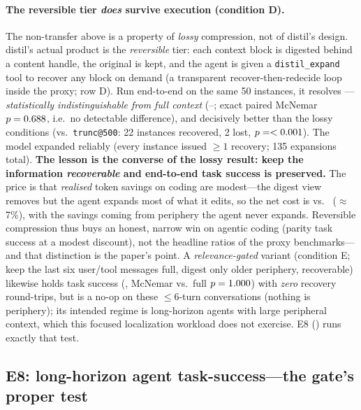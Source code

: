 \documentclass[11pt]{article}
\newcommand{\sweEsevenN}{50}\newcommand{\sweEsevenSeed}{1729}%
\newcommand{\sweEsevenFullPass}{--}\newcommand{\sweEsevenFullResolved}{--}%
\begin{document}
\paragraph{The reversible tier \emph{does} survive execution (condition D).} The
non-transfer above is a property of \emph{lossy} compression, not of distil's design.
distil's actual product is the \emph{reversible} tier: each context block is digested
behind a content handle, the original is kept, and the agent is given a
\texttt{distil\_expand} tool to recover any block on demand (a transparent
recover-then-redecide loop inside the proxy;  row D). Run end-to-end on the
same \sweEsevenN{} instances, it resolves \textbf{\sweEsevenExpandPass}---\emph{statistically
indistinguishable from full context} (\sweEsevenFullPass{}; exact paired McNemar
$p=0.688{}$, i.e.\ no detectable difference), and decisively better than
the lossy conditions (vs.\ \texttt{trunc@500}: 22 instances recovered, 2 lost,
$p=<0.001{}$). The model expanded reliably (every instance issued
$\ge 1$ recovery; 135 expansions total). \textbf{The lesson is the converse of the
lossy result: keep the information \emph{recoverable} and end-to-end task success is
preserved.} The price is that \emph{realised} token savings on coding are modest---the
digest view removes \sweEsevenExpandCtxRed{} but the agent expands most of what it edits,
so the net cost is \sweEsevenExpandCost{} vs.\ \sweEsevenFullCost{} ($\approx$7\%), with
the savings coming from periphery the agent never expands. Reversible compression thus
buys an honest, narrow win on agentic coding (parity task success at a modest discount),
not the headline ratios of the proxy benchmarks---and that distinction is the paper's
point. A \emph{relevance-gated} variant (condition E; keep the last six user/tool
messages full, digest only older periphery, recoverable) likewise holds task success
(\sweEsevenGatedPass{}, McNemar vs.\ full $p=1.000{}$) with \emph{zero}
recovery round-trips, but is a no-op on these $\le$6-turn conversations (nothing is
periphery); its intended regime is long-horizon agents with large peripheral context,
which this focused localization workload does not exercise. E8 () runs
exactly that test.

\subsection{E8: long-horizon agent task-success---the gate's proper test}
\label{sec:e8}
\end{document}
